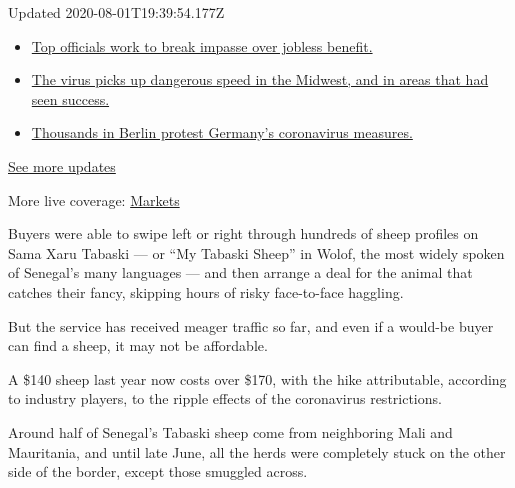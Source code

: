 Updated 2020-08-01T19:39:54.177Z

\begin{itemize}
\tightlist
\item
  \href{https://www.nytimes3xbfgragh.onion/2020/08/01/world/coronavirus-covid-19.html?action=click\&pgtype=Article\&state=default\&region=MAIN_CONTENT_1\&context=storylines_live_updates\#link-3ac56579}{Top
  officials work to break impasse over jobless benefit.}
\item
  \href{https://www.nytimes3xbfgragh.onion/2020/08/01/world/coronavirus-covid-19.html?action=click\&pgtype=Article\&state=default\&region=MAIN_CONTENT_1\&context=storylines_live_updates\#link-8796723}{The
  virus picks up dangerous speed in the Midwest, and in areas that had
  seen success.}
\item
  \href{https://www.nytimes3xbfgragh.onion/2020/08/01/world/coronavirus-covid-19.html?action=click\&pgtype=Article\&state=default\&region=MAIN_CONTENT_1\&context=storylines_live_updates\#link-25930521}{Thousands
  in Berlin protest Germany's coronavirus measures.}
\end{itemize}

\href{https://www.nytimes3xbfgragh.onion/2020/08/01/world/coronavirus-covid-19.html?action=click\&pgtype=Article\&state=default\&region=MAIN_CONTENT_1\&context=storylines_live_updates}{See
more updates}

More live coverage:
\href{https://www.nytimes3xbfgragh.onion/live/2020/07/31/business/stock-market-today-coronavirus?action=click\&pgtype=Article\&state=default\&region=MAIN_CONTENT_1\&context=storylines_live_updates}{Markets}

Buyers were able to swipe left or right through hundreds of sheep
profiles on Sama Xaru Tabaski --- or ``My Tabaski Sheep'' in Wolof, the
most widely spoken of Senegal's many languages --- and then arrange a
deal for the animal that catches their fancy, skipping hours of risky
face-to-face haggling.

But the service has received meager traffic so far, and even if a
would-be buyer can find a sheep, it may not be affordable.

A \$140 sheep last year now costs over \$170, with the hike
attributable, according to industry players, to the ripple effects of
the coronavirus restrictions.

Around half of Senegal's Tabaski sheep come from neighboring Mali and
Mauritania, and until late June, all the herds were completely stuck on
the other side of the border, except those smuggled across.

